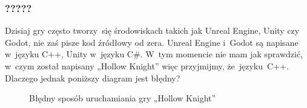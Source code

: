 \documentclass[10pt,t]{beamer}
\begin{document}
\begin{frame}
  \frametitle{?????}


  Dzisiaj gry często tworzy~się środowiskach takich jak Unreal Engine,
  Unity czy Godot, nie zaś pisze kod źródłowy od zera. Unreal Engine
  i~Godot są napisane w~języku C++, Unity w~języku C\#. W~tym momencie nie
  mam jak sprawdzić, w~czym został napisany „Hollow Knight” więc przyjmijmy,
  że~języku~C++. Dlaczego jednak poniższy diagram jest błędny?





  \begin{figure}

    \label{fig:Running-Hollow-Knight-good}


    \caption{Błędny sposób uruchamiania gry „Hollow Knight”}


  \end{figure}

\end{frame}
\end{document}

